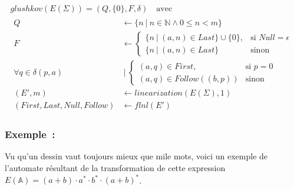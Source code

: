 \documentclass[12pt]{article}
\begin{document}
\begin{gather}
    glushkov     (E(\Sigma)) = (Q, \{0\}, F, \delta) \quad \text{avec} \\
    \begin{align*}
        Q                                             & \leftarrow \{n ~|~ n \in \mathbb{N} \land 0 \leq n < m\}                                                                                            \\
        F                                             & \leftarrow \begin{cases} \{n ~|~ (a, n) \in Last\} \cup \{0\}, & \text{si } Null = \epsilon \\ \{n ~|~ (a, n) \in Last\} & \text{sinon} \end{cases} \\
        \forall q                    \in \delta(p, a) & ~|~ \begin{cases} (a, q) \in First, & \text{si } p = 0 \\ (a, q) \in Follow((b, p)) & \text{sinon} \end{cases}                                      \\
        (E', m)                                       & \leftarrow linearization(E(\Sigma), 1)                                                                                                              \\
        (First, Last, Null, Follow)                   & \leftarrow flnl(E')
    \end{align*}
\end{gather}

\subsubsection*{Exemple~:}

Vu qu'un dessin vaut toujours mieux que mile mots, voici un exemple de
l'automate résultant de la transformation de cette expression \(E(\mathbb{A}) =
(a+b) \cdot a^* \cdot b^* \cdot (a+b)^*\).
\end{document}
